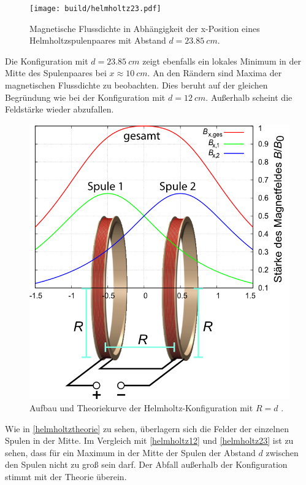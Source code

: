 \begin{figure}[H]
    \texttt{[image: build/helmholtz23.pdf]}
    \caption{Magnetische Flussdichte in Abhängigkeit der x-Position eines Helmholtzspulenpaares mit Abstand $d =\SI{23.85}{cm}$.}
    \label{helmholtz23}
\end{figure}
Die Konfiguration mit $d = \SI{23.85}{cm}$ zeigt ebenfalls ein lokales Minimum in der Mitte des Spulenpaares bei $x \approx \SI{10}{cm}$. An den Rändern sind Maxima der magnetischen Flussdichte zu beobachten.
Dies beruht auf der gleichen Begründung wie bei der Konfiguration mit $d =\SI{12}{cm}$. Außerhalb scheint die Feldstärke wieder abzufallen.
\begin{figure}[H]
    \includegraphics[width=\linewidth]{fotos/helmholtzspuletheriekurve.png}
    \caption{Aufbau und Theoriekurve der Helmholtz-Konfiguration mit $R = d$ \cite{leifi}.}
    \label{helmholtztheorie}
\end{figure}
Wie in \autoref{helmholtztheorie} zu sehen, überlagern sich die Felder der einzelnen Spulen in der Mitte. Im Vergleich mit \autoref{helmholtz12} und \autoref{helmholtz23}
ist zu sehen, dass für ein Maximum in der Mitte der Spulen der Abstand $d$ zwischen den Spulen nicht zu groß sein darf. Der Abfall außerhalb der Konfiguration stimmt
mit der Theorie überein.  
\newpage
